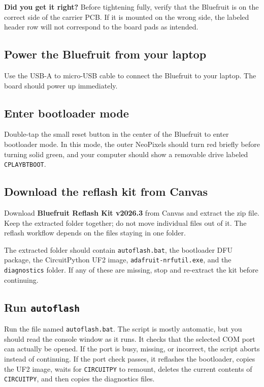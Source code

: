 \documentclass[11pt]{article}
\newcommand{\kit}[1]{\texttt{#1}}
\begin{document}
\begin{warningbox}
\textbf{Did you get it right?} Before tightening fully, verify that the Bluefruit is on the correct side of the carrier PCB. If it is mounted on the wrong side, the labeled header row will not correspond to the board pads as intended.
\end{warningbox}

\subsection{Power the Bluefruit from your laptop}
Use the USB-A to micro-USB cable to connect the Bluefruit to your laptop. The board should power up immediately.

\subsection{Enter bootloader mode}
Double-tap the small reset button in the center of the Bluefruit to enter bootloader mode. In this mode, the outer NeoPixels should turn red briefly before turning solid green, and your computer should show a removable drive labeled \kit{CPLAYBTBOOT}.

\subsection{Download the reflash kit from Canvas}
Download \textbf{Bluefruit Reflash Kit v2026.3} from Canvas and extract the zip file. Keep the extracted folder together; do not move individual files out of it. The reflash workflow depends on the files staying in one folder.

\begin{notebox}
The extracted folder should contain \kit{autoflash.bat}, the bootloader DFU package, the CircuitPython UF2 image, \kit{adafruit-nrfutil.exe}, and the \kit{diagnostics} folder. If any of these are missing, stop and re-extract the kit before continuing.
\end{notebox}

\subsection{Run \kit{autoflash}}
Run the file named \kit{autoflash.bat}. The script is mostly automatic, but you should read the console window as it runs. It checks that the selected COM port can actually be opened. If the port is busy, missing, or incorrect, the script aborts instead of continuing. If the port check passes, it reflashes the bootloader, copies the UF2 image, waits for \kit{CIRCUITPY} to remount, deletes the current contents of \kit{CIRCUITPY}, and then copies the diagnostics files.
\end{document}
